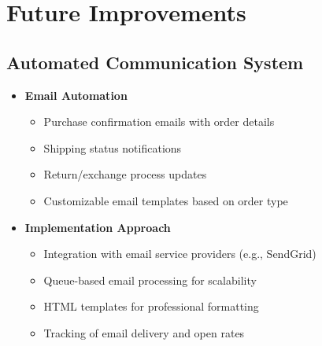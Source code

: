 \documentclass[12pt,a4paper]{article}
\begin{document}
\section{Future Improvements}

\subsection{Automated Communication System}
\begin{itemize}
    \item \textbf{Email Automation}
    \begin{itemize}
        \item Purchase confirmation emails with order details
        \item Shipping status notifications
        \item Return/exchange process updates
        \item Customizable email templates based on order type
    \end{itemize}
    
    \item \textbf{Implementation Approach}
    \begin{itemize}
        \item Integration with email service providers (e.g., SendGrid)
        \item Queue-based email processing for scalability
        \item HTML templates for professional formatting
        \item Tracking of email delivery and open rates
    \end{itemize}
\end{itemize}
\end{document}
